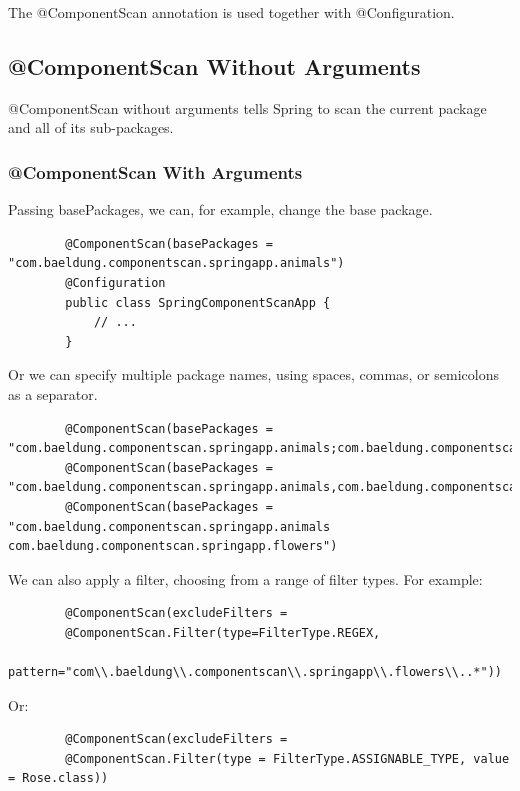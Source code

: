\documentclass{scrartcl}
\begin{document}
    The @ComponentScan annotation is used together with @Configuration.

\subsection{@ComponentScan Without Arguments}

    @ComponentScan without arguments tells Spring to scan the current package and all of its sub-packages.

\subsubsection{@ComponentScan With Arguments}

    Passing basePackages, we can, for example, change the base package.

    \begin{lstlisting}
        @ComponentScan(basePackages = "com.baeldung.componentscan.springapp.animals")
        @Configuration
        public class SpringComponentScanApp {
            // ...
        }
    \end{lstlisting}

    Or we can specify multiple package names, using spaces, commas, or semicolons as a separator.

    \begin{lstlisting}
        @ComponentScan(basePackages = "com.baeldung.componentscan.springapp.animals;com.baeldung.componentscan.springapp.flowers")
        @ComponentScan(basePackages = "com.baeldung.componentscan.springapp.animals,com.baeldung.componentscan.springapp.flowers")
        @ComponentScan(basePackages = "com.baeldung.componentscan.springapp.animals com.baeldung.componentscan.springapp.flowers")
    \end{lstlisting}

    We can also apply a filter, choosing from a range of filter types. For example:

    \begin{lstlisting}
        @ComponentScan(excludeFilters =
        @ComponentScan.Filter(type=FilterType.REGEX,
        pattern="com\\.baeldung\\.componentscan\\.springapp\\.flowers\\..*"))
    \end{lstlisting}

    Or:
    \begin{lstlisting}
        @ComponentScan(excludeFilters =
        @ComponentScan.Filter(type = FilterType.ASSIGNABLE_TYPE, value = Rose.class))
    \end{lstlisting}
\end{document}
